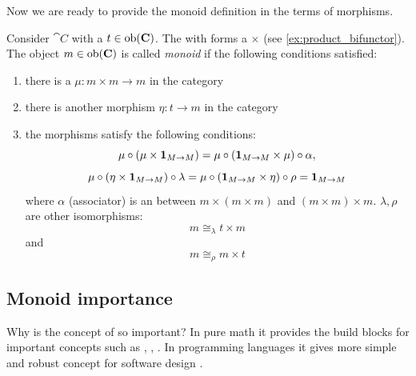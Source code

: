 Now we are ready to provide the monoid definition in the terms of morphisms.
\begin{definition}[Monoid]
\label{def:monoid_category}
Consider  $\cat{C}$ with a
 $t \in \mathrm{ob}(\mathbf{C})$. The 
with  forms a
 $\times$ (see \cref{ex:product_bifunctor}).
The object $m \in
\mathrm{ob}(\mathbf{C})$ is called \textit{monoid} if the following
conditions satisfied:
\begin{enumerate}
\item there is a  $\mu: m \times m \to m$ in
  the category
\item there is another morphism $\eta: t \to m$ in the category
\item the morphisms satisfy the following conditions:
\begin{equation}
\mu\circ\left(\mu \times
    \mathbf{1}_{ M \to M }\right) = \mu \circ \left(\mathbf{1}_{ M \to M } \times \mu\right) \circ
    \alpha,
\label{eq:monoid_def_mu}
\end{equation}
\begin{equation}
\mu \circ (\eta \times \mathbf{1}_{ M \to M })
\circ \lambda = \mu \circ (\mathbf{1}_{ M \to M } \times \eta) \circ \rho =
\mathbf{1}_{ M \to M }
\label{eq:monoid_def_eta}
\end{equation}
where $\alpha$ (associator) is an  between
$m \times (m \times m)$ and $(m \times m) \times m$. $\lambda, \rho$
are other isomorphisms:  
\[
m \cong_\lambda t \times m
\]
and
\[
m \cong_\rho m \times t 
\]
\end{enumerate}
\end{definition}

\subsection{Monoid importance}
\label{ch:monoid_importance_monad}
Why is the concept of  so important? 
In pure math it provides the build blocks for important concepts such as
, , 
\cite{github:galois_ivanmurashko}. In programming 
languages it gives more simple and robust concept for software
design \cite{bib:scalable_program_arch}.

